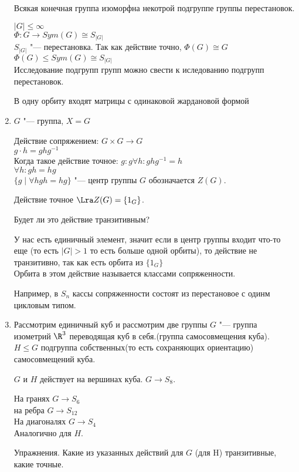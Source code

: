 \begin{exmp}
\begin{enumerate}
\begin{conseq}
Всякая конечная группа изоморфна некотрой подгруппе группы перестановок.

$|G| \le \infty$ \\
$\Phi \colon G \to Sym(G)\cong S_{|G|}$\\
$S_{|G|}$ "--- перестановка.
Так как действие точно, $\Phi(G) \cong G$\\
$\Phi(G) \le Sym(G) \cong S_{|G|}$\\

Исследование подгрупп групп можно свести к иследованию подгрупп перестановок.
\begin{Rem}
  В одну орбиту входят матрицы с одинаковой жардановой формой
\end{Rem}
\end{conseq}
\item
$G$ "--- группа, $X = G$

Действие сопряжением:
$G \times G \to G$\\
$g \cdot h = ghg^{-1}$\\
Когда такое действие точное:
$g \colon g \forall h \colon ghg^{-1} = h$\\
$\forall h \colon gh = hg$ \\
$\{g \mid \forall h gh = hg\} $ "--- центр группы $G$ обозначается $Z(G)$.

Действие точное $\Lra Z(G) = \{1_{G}\}$.

Будет ли это действие транзитивным?

У нас есть единичный элемент, значит если в центр группы входит что-то еще (то есть $|G| > 1$ то есть больше одной орбиты), то 
действие не транзитивно, так  как есть орбита из $\{1_G\}$\\

Орбита в этом действие называется классами сопряженности.

Например, в $S_n$ кассы сопряженности состоят из перестановое с одинм цикловым типом.
\item
Рассмотрим единичный куб и рассмотрим две группы 
$G$ "--- группа изометрий $\R^3$ переводящая куб в себя.(группа самосовмещения куба).
$H \le G$ подгруппа собственных(то есть сохраняющих ориентацию) самосовмещений куба.

$G$ и $H$ действует на вершинах куба.
$G \to S_8$.

На гранях $G \to S_6$\\
на ребра $G \to S_{12}$\\
На диагоналях $G \to S_4$\\

Аналогично для $H$.


Упражнения. Какие из указанных действий для $G$ (для H) транзитивные, 
какие точные.
\end{enumerate}
\end{exmp}
                       
